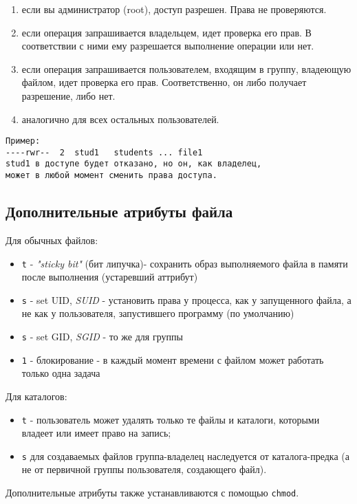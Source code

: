 \begin{enumerate}
	\item если вы администратор (root), доступ разрешен. Права не проверяются.
	\item если операция запрашивается владельцем, идет проверка его прав. В соответствии с ними ему разрешается выполнение операции или нет.
	\item если операция запрашивается пользователем, входящим в группу, владеющую файлом, идет проверка его прав. Соответственно, он либо получает разрешение, либо нет.
	\item аналогично для всех остальных пользователей.
\end{enumerate}
\begin{verbatim}
Пример: 
----rwr--  2  stud1   students ... file1  
stud1 в доступе будет отказано, но он, как владелец, 
может в любой момент сменить права доступа. 
\end{verbatim}

\subsection{Дополнительные атрибуты файла}

Для обычных файлов:
\begin{itemize}
	\item \verb+t+ - \emph{"sticky bit"} (бит липучка)- сохранить образ выполняемого файла в памяти после выполнения (устаревший аттрибут)
	\item \verb+s+ - set UID, \emph{SUID} - установить права у процесса, как у запущенного файла, а не как у пользователя, запустившего программу (по умолчанию)
	\item \verb+s+ - set GID, \emph{SGID} - то же для группы
	\item \verb+1+ - блокирование - в каждый момент времени с файлом может работать только одна задача
\end{itemize}

Для каталогов:
\begin{itemize}
	\item \verb+t+ - пользователь может удалять только те файлы и каталоги, которыми владеет или имеет право на запись;
	\item \verb+s+ для создаваемых файлов группа-владелец наследуется от каталога-предка (а не от первичной группы пользователя, создающего файл).
\end{itemize}

Дополнительные атрибуты также устанавливаются с помощью \verb+chmod+.

